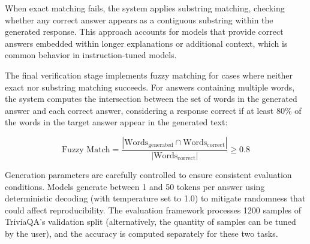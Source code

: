 When exact matching fails, the system applies substring matching, checking whether any correct answer appears as a contiguous substring within the generated response. This approach accounts for models that provide correct answers embedded within longer explanations or additional context, which is common behavior in instruction-tuned models.

The final verification stage implements fuzzy matching for cases where neither exact nor substring matching succeeds. For answers containing multiple words, the system computes the intersection between the set of words in the generated answer and each correct answer, considering a response correct if at least 80\% of the words in the target answer appear in the generated text:

\begin{equation}
\text{Fuzzy Match} = \frac{|\text{Words}_{\text{generated}} \cap \text{Words}_{\text{correct}}|}{|\text{Words}_{\text{correct}}|} \geq 0.8
\end{equation}

Generation parameters are carefully controlled to ensure consistent evaluation conditions. Models generate between 1 and 50 tokens per answer using deterministic decoding (with temperature set to 1.0) to mitigate randomness that could affect reproducibility. The evaluation framework processes 1200 samples of TriviaQA's validation split (alternatively, the quantity of samples can be tuned by the user), and the accuracy is computed separately for these two tasks.